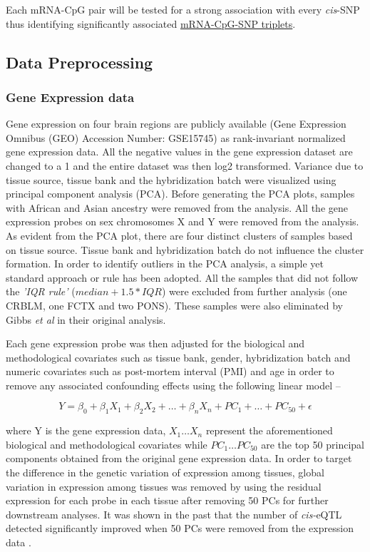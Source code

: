 \documentclass[hidelinks]{article}
\begin{document}
Each mRNA-CpG pair will be tested for a strong association with every \emph{cis}-SNP thus identifying significantly associated \underline{mRNA-CpG-SNP triplets}. 

\subsection{Data Preprocessing}
\subsubsection{Gene Expression data}
Gene expression on four brain regions are publicly available (Gene Expression Omnibus (GEO) Accession Number: GSE15745) as rank-invariant \cite{rankInvariant} normalized gene expression data. All the negative values in the gene expression dataset are changed to a 1 and the entire dataset was then log2 transformed. Variance due to tissue source, tissue bank and the hybridization batch were visualized using principal component analysis (PCA). Before generating the PCA plots, samples with African and Asian ancestry were removed from the analysis. All the gene expression probes on sex chromosomes X and Y were removed from the analysis. As evident from the PCA plot, there are four distinct clusters of samples based on tissue source. Tissue bank and hybridization batch do not influence the cluster formation. In order to identify outliers in the PCA analysis, a simple yet standard approach or rule has been adopted. All the samples that did not follow the \emph{'IQR rule'} ($median + 1.5 * IQR$) were excluded from further analysis (one CRBLM, one FCTX and two PONS). These samples were also eliminated by Gibbs \emph{et al} in their original analysis. 

Each gene expression probe was then adjusted for the biological and methodological covariates such as tissue bank, gender, hybridization batch and numeric covariates such as post-mortem interval (PMI) and age in order to remove any associated confounding effects using the following linear model --

\begin{equation*}
Y = \beta_0 + \beta_1 X_1 + \beta_2 X_2 + \ldots + \beta_n X_n + PC_1 + \ldots + PC_{50} + \epsilon
\end{equation*}

where Y is the gene expression data, $X_1 \ldots X_n$ represent the aforementioned biological and methodological covariates while $PC_1 \ldots PC_{50}$ are the top 50 principal components obtained from the original gene expression data. In order to target the difference in the genetic variation of expression among tissues, global variation in expression among tissues was removed by using the residual expression for each probe in each tissue after removing 50 PCs for further downstream analyses. It was shown in the past that the number of \emph{cis-}eQTL detected significantly improved when 50 PCs were removed from the expression data \cite{Fu_Jing}.
\end{document}
